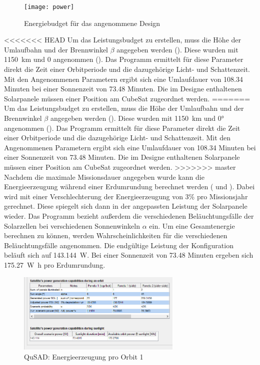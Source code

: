 										\begin{figure}[H]
											\centering
												\texttt{[image: power]}
											\caption{Energiebudget für das angenommene Design}
											\label{fig:power}
										\end{figure}
<<<<<<< HEAD
Um das Leistungsbudget zu erstellen, muss die Höhe der Umlaufbahn und der Brennwinkel $\beta$ angegeben werden (). Diese wurden mit \SI{1150}{\kilo\metre} und 0\textdegree{} angenommen ().  Das Programm ermittelt für diese Parameter direkt die Zeit einer Orbitperiode und die dazugehörige Licht- und Schattenzeit. Mit den Angenommenen Parametern ergibt sich eine Umlaufdauer von \num{108,34} Minuten bei einer Sonnenzeit von \num{73,48} Minuten. Die im Designe enthaltenen Solarpanele müssen einer Position am CubeSat zugeordnet werden.
=======
Um das Leistungsbudget zu erstellen, muss die Höhe der Umlaufbahn und der Brennwinkel $\beta$ angegeben werden (). Diese wurden mit \SI{1150}{\kilo\metre} und \num{0}° angenommen ().  Das Programm ermittelt für diese Parameter direkt die Zeit einer Orbitperiode und die dazugehörige Licht- und Schattenzeit. Mit den Angenommenen Parametern ergibt sich eine Umlaufdauer von \num{108,34} Minuten bei einer Sonnenzeit von \num{73,48} Minuten. Die im Designe enthaltenen Solarpanele müssen einer Position am CubeSat zugeordnet werden.
>>>>>>> master
Nachdem die maximale Missionsdauer angegeben wurde kann die Energieerzeugung während einer Erdumrundung berechnet werden ( und ). Dabei wird mit einer  Verschlechterung der Energieerzeugung von \num{3}\% pro Missionsjahr gerechnet. Diese spiegelt sich dann in der angepassten Leistung der Solarpanele wieder. Das Programm bezieht außerdem die verschiedenen Beläuchtungsfälle der Solarzellen bei verschiedenen Sonnenwinkeln $\alpha$ ein. Um eine Gesamtenergie berechnen zu können,  werden Wahrscheinlichkeiten für die verschiedenen Beläuchtungsfälle angenommen. Die endgültige Leistung der Konfiguration beläuft sich auf \SI{143,144}{\watt}. Bei einer Sonnenzeit von \num{73,48} Minuten ergeben sich \SI{175,27}{\watt\hour} pro Erdumrundung. 
			
			\begin{figure}[H]
				\centering
					\includegraphics[width=0.70\textwidth]{graphics/power3.png}
				\caption{QuSAD: Energieerzeugung pro Orbit 1}
				\label{fig:power3}
			\end{figure}
			
